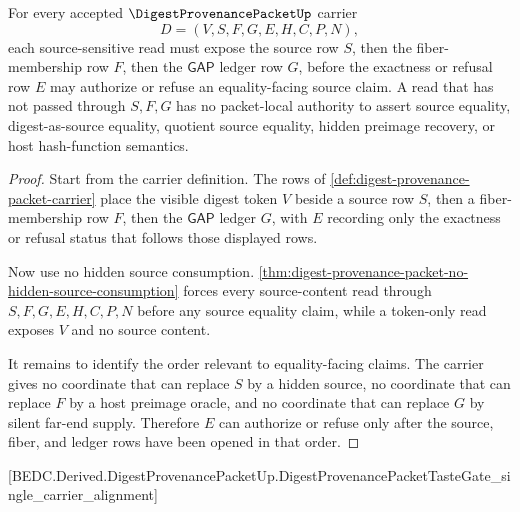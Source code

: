 \begin{theorem}
\label{thm:digest-provenance-packet-source-fiber-ledger-order}
For every accepted $\DigestProvenancePacketUp$ carrier
$$
D=(V,S,F,G,E,H,C,P,N),
$$
each source-sensitive read must expose the source row $S$, then the fiber-membership row $F$, then the $\mathsf{GAP}$ ledger row $G$, before the exactness or refusal row $E$ may authorize or refuse an equality-facing source claim. A read that has not passed through $S,F,G$ has no packet-local authority to assert source equality, digest-as-source equality, quotient source equality, hidden preimage recovery, or host hash-function semantics.
\end{theorem}
\begin{proof}
Start from the carrier definition. The rows of \autoref{def:digest-provenance-packet-carrier} place the visible digest token $V$ beside a source row $S$, then a fiber-membership row $F$, then the $\mathsf{GAP}$ ledger $G$, with $E$ recording only the exactness or refusal status that follows those displayed rows.

Now use no hidden source consumption. \autoref{thm:digest-provenance-packet-no-hidden-source-consumption} forces every source-content read through $S,F,G,E,H,C,P,N$ before any source equality claim, while a token-only read exposes $V$ and no source content.

It remains to identify the order relevant to equality-facing claims. The carrier gives no coordinate that can replace $S$ by a hidden source, no coordinate that can replace $F$ by a host preimage oracle, and no coordinate that can replace $G$ by silent far-end supply. Therefore $E$ can authorize or refuse only after the source, fiber, and ledger rows have been opened in that order.
\end{proof}

[BEDC.Derived.DigestProvenancePacketUp.DigestProvenancePacketTasteGate\_single\_carrier\_alignment]

